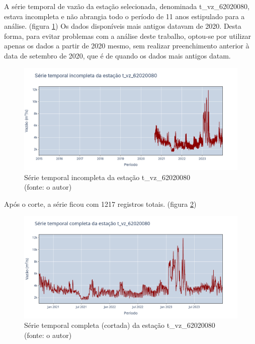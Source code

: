 A série temporal de vazão da estação selecionada, denominada t\_vz\_62020080, estava incompleta e não abrangia todo o período de 11 anos estipulado para a análise. (figura \ref{fig:grandeSerieIncompleta_t_vz_62020080}) Os dados disponíveis mais antigos datavam de 2020. Desta forma, para evitar problemas com a análise deste trabalho, optou-se por utilizar apenas os dados a partir de 2020 mesmo, sem realizar preenchimento anterior à data de setembro de 2020, que é de quando os dados mais antigos datam.

\begin{figure}[!h]
	\centering
	\includegraphics[scale=0.25]{Figuras/rio_grande/grandeSerieIncompleta_t_vz_62020080.png}
	\caption{Série temporal incompleta da estação t\_vz\_62020080\\(fonte: o autor)}
	\label{fig:grandeSerieIncompleta_t_vz_62020080}
\end{figure}

Após o corte, a série ficou com 1217 registros totais. (figura \ref{fig:serie_completa_estacao_t_vz_62020080})

\begin{figure}[!h]
	\centering
	\includegraphics[scale=0.25]{Figuras/rio_grande/serie_completa_estacao_t_vz_62020080.png}
	\caption{Série temporal completa (cortada) da estação t\_vz\_62020080\\(fonte: o autor)}
	\label{fig:serie_completa_estacao_t_vz_62020080}
\end{figure}

